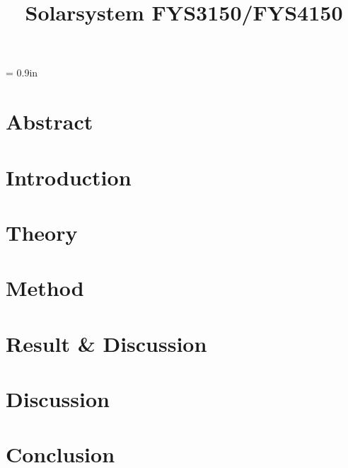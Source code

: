 
\title{Solarsystem FYS3150/FYS4150}

\mnfrontpage
\pagebreak



\pagestyle{fancy}
\fancyhf{}
\fancyfoot[CE,LO]{\leftmark}

\renewcommand{\headrulewidth}{2pt}
\renewcommand{\footrulewidth}{1pt}

\tableofcontents

\marginparwidth = 0.9in

\section*{Abstract}%




\pagebreak
\section{Introduction}




\pagebreak
\section{Theory}




\pagebreak
\section{Method}




\pagebreak
\section{Result \& Discussion}




\pagebreak
\section{Discussion}




\pagebreak
\section{Conclusion}




